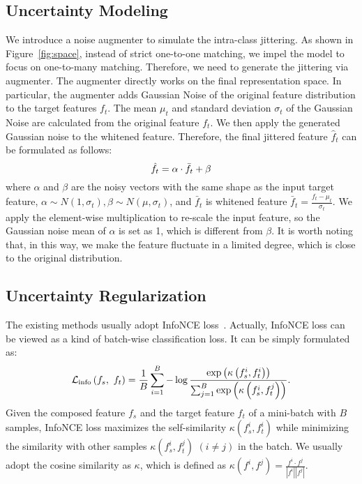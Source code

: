 \documentclass[10pt,twocolumn,letterpaper]{article}
\begin{document}
\subsection{Uncertainty Modeling} 
We introduce a noise augmenter to simulate the intra-class jittering. As shown in Figure~\ref{fig:space}, instead of strict one-to-one matching, we impel the model to focus on one-to-many matching. Therefore, we need to generate the jittering via augmenter.   
The augmenter directly works on the final representation space. 
In particular, the augmenter adds Gaussian Noise of the original feature distribution to the target features $f_t$. 
The mean $\mu_t$ and standard deviation $\sigma_t$ of the Gaussian Noise are calculated from the original feature $f_t$. We then apply the generated Gaussian noise to the whitened feature. Therefore, the final jittered feature $\hat{f}_t$ can be formulated as follows:\vspace{-2mm}
\begin{equation} 
\hat{f}_t = \alpha \cdot \bar{f_t} + \beta \label{augment}
\vspace{-2mm}
\end{equation}
where $\alpha$ and $\beta$ are the noisy vectors with the same shape as the input target feature, $\alpha \sim N(1, \sigma_t), \beta \sim N(\mu, \sigma_t)$, and $\bar{f}_t$ is whitened feature $\bar{f}_t = \frac{f_t-\mu_t}{\sigma_t}$. We apply the element-wise multiplication to re-scale the input feature, so the Gaussian noise mean of $\alpha$ is set as 1, which is different from $\beta$. It is worth noting that, in this way, we make the feature fluctuate in a limited degree, which is close to the original distribution.   


\subsection{Uncertainty Regularization}
The existing methods usually adopt InfoNCE loss~\cite{NIPS2004_42fe8808, Movshovitz-Attias_2017_ICCV,NIPS2017_cb8da676, Gidaris_2018_CVPR, TIRG, 2021CoSMo}. Actually, InfoNCE loss can be viewed as a kind of batch-wise classification loss. It can be simply formulated as:\vspace{-2mm}
\begin{equation}
    \mathcal{L}_{\mathrm{info}} \left( f_s,\ f_t \right)=\frac{1}{B} \sum_{i=1}^{B}-\log \frac{\exp \left(\kappa\left(f^i_s, f^i_t\right)\right)}{\sum_{j=1}^{B} \exp \left(\kappa\left(f^i_s, f^j_t\right)\right)}.
    \label{equ1}\vspace{-1mm}
\end{equation}
Given the composed feature $f_s$ and the target feature $f_t$ of a mini-batch with $B$ samples, InfoNCE loss maximizes the self-similarity $\kappa\left(f^i_s, f^i_t\right)$ while minimizing the similarity with other samples $\kappa\left(f^i_s, f^j_t\right)$ $(i\neq j)$ in the batch. We usually adopt the cosine similarity as $\kappa$, which is defined as $\kappa(f^i, f^j) = \frac{f^i\cdot f^j}{|f^i||f^j|}$. 
\end{document}
